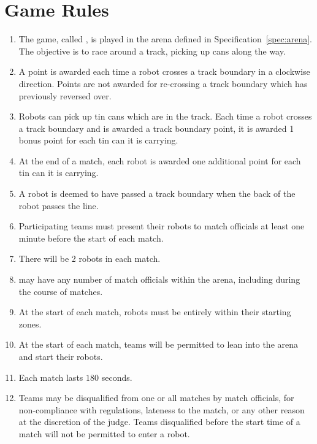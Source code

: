 \section{Game Rules}
\label{sec:rules}

\begin{enumerate}
  \item The game, called \emph{\gamename}, is played in the arena defined in
        Specification~\ref{spec:arena}. The objective is to race around a
        track, picking up cans along the way.
  \item A point is awarded each time a robot crosses a track boundary in a
        clockwise direction. Points are not awarded for re-crossing a track
        boundary which has previously reversed over.
  \item Robots can pick up tin cans which are in the track. Each time a robot
        crosses a track boundary and is awarded a track boundary point, it is
        awarded 1 bonus point for each tin can it is carrying.
  \item At the end of a match, each robot is awarded one additional point for
        each tin can it is carrying.
  \item A robot is deemed to have passed a track boundary when the back of the
        robot passes the line.
  \item Participating teams must present their robots to match officials at
        least one minute before the start of each match.
  \item There will be 2 robots in each match.
  \item \org may have any number of match officials within the arena, including
        during the course of matches.
  \item At the start of each match, robots must be entirely within their
        starting zones.
  \item At the start of each match, teams will be permitted to lean into the
        arena and start their robots.
  \item Each match lasts $180$ seconds.
  \item Teams may be disqualified from one or all matches by match officials,
        for non-compliance with regulations, lateness to the match, or any other
        reason at the discretion of the judge. Teams disqualified before the
        start time of a match will not be permitted to enter a robot.
\end{enumerate}

